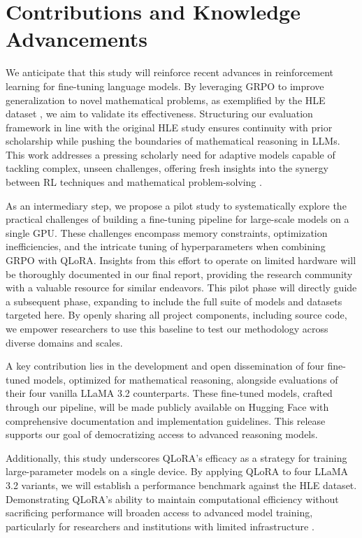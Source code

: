 \documentclass{svproc}
\begin{document}


\section{Contributions and Knowledge Advancements}

We anticipate that this study will reinforce recent advances in reinforcement learning for fine-tuning language models. By leveraging GRPO to improve generalization to novel mathematical problems, as exemplified by the HLE dataset \cite{phan2025humanitysexam}, we aim to validate its effectiveness. Structuring our evaluation framework in line with the original HLE study ensures continuity with prior scholarship while pushing the boundaries of mathematical reasoning in LLMs. This work addresses a pressing scholarly need for adaptive models capable of tackling complex, unseen challenges, offering fresh insights into the synergy between RL techniques and mathematical problem-solving \cite{sutton2018reinforcement}.

As an intermediary step, we propose a pilot study to systematically explore the practical challenges of building a fine-tuning pipeline for large-scale models on a single GPU. These challenges encompass memory constraints, optimization inefficiencies, and the intricate tuning of hyperparameters when combining GRPO with QLoRA. Insights from this effort to operate on limited hardware will be thoroughly documented in our final report, providing the research community with a valuable resource for similar endeavors. This pilot phase will directly guide a subsequent phase, expanding to include the full suite of models and datasets targeted here. By openly sharing all project components, including source code, we empower researchers to use this baseline to test our methodology across diverse domains and scales.

A key contribution lies in the development and open dissemination of four fine-tuned models, optimized for mathematical reasoning, alongside evaluations of their four vanilla LLaMA 3.2 counterparts. These fine-tuned models, crafted through our pipeline, will be made publicly available on Hugging Face with comprehensive documentation and implementation guidelines. This release supports our goal of democratizing access to advanced reasoning models.

Additionally, this study underscores QLoRA’s efficacy as a strategy for training large-parameter models on a single device. By applying QLoRA to four LLaMA 3.2 variants, we will establish a performance benchmark against the HLE dataset. Demonstrating QLoRA’s ability to maintain computational efficiency without sacrificing performance will broaden access to advanced model training, particularly for researchers and institutions with limited infrastructure \cite{dettmers2023qloraefficientfinetuningquantized}.
\end{document}
